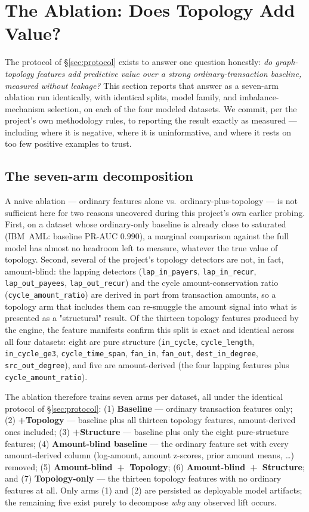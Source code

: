 \section{The Ablation: Does Topology Add Value?}\label{sec:ablation}

The protocol of \S\ref{sec:protocol} exists to answer one question honestly: \emph{do graph-topology features add predictive value over a strong ordinary-transaction baseline, measured without leakage?} This section reports that answer as a seven-arm ablation run identically, with identical splits, model family, and imbalance-mechanism selection, on each of the four modeled datasets. We commit, per the project's own methodology rules, to reporting the result exactly as measured — including where it is negative, where it is uninformative, and where it rests on too few positive examples to trust.

\subsection{The seven-arm decomposition}
A naive ablation — ordinary features alone vs.\ ordinary-plus-topology — is not sufficient here for two reasons uncovered during this project's own earlier probing. First, on a dataset whose ordinary-only baseline is already close to saturated (IBM~AML: baseline PR-AUC $0.990$), a marginal comparison against the full model has almost no headroom left to measure, whatever the true value of topology. Second, several of the project's topology detectors are not, in fact, amount-blind: the lapping detectors (\texttt{lap\_in\_payers}, \texttt{lap\_in\_recur}, \texttt{lap\_out\_payees}, \texttt{lap\_out\_recur}) and the cycle amount-conservation ratio (\texttt{cycle\_amount\_ratio}) are derived in part from transaction amounts, so a topology arm that includes them can re-smuggle the amount signal into what is presented as a "structural" result. Of the thirteen topology features produced by the engine, the feature manifests confirm this split is exact and identical across all four datasets: eight are pure structure (\texttt{in\_cycle}, \texttt{cycle\_length}, \texttt{in\_cycle\_ge3}, \texttt{cycle\_time\_span}, \texttt{fan\_in}, \texttt{fan\_out}, \texttt{dest\_in\_degree}, \texttt{src\_out\_degree}), and five are amount-derived (the four lapping features plus \texttt{cycle\_amount\_ratio}).

The ablation therefore trains seven arms per dataset, all under the identical protocol of \S\ref{sec:protocol}: (1) \textbf{Baseline} — ordinary transaction features only; (2) \textbf{+Topology} — baseline plus all thirteen topology features, amount-derived ones included; (3) \textbf{+Structure} — baseline plus only the eight pure-structure features; (4) \textbf{Amount-blind baseline} — the ordinary feature set with every amount-derived column (log-amount, amount z-scores, prior amount means, \ldots) removed; (5) \textbf{Amount-blind~+~Topology}; (6) \textbf{Amount-blind~+~Structure}; and (7) \textbf{Topology-only} — the thirteen topology features with no ordinary features at all. Only arms (1) and (2) are persisted as deployable model artifacts; the remaining five exist purely to decompose \emph{why} any observed lift occurs.

